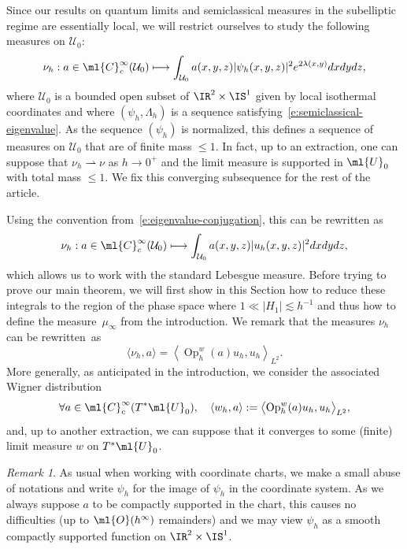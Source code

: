 \documentclass[10pt]{amsart}
\newcommand\mto{\mathchoice{\longmapsto}{\mapsto}{\mapsto}{\mapsto}}
\theoremstyle{plain}
\theoremstyle{definition}
\theoremstyle{remark}
\newtheorem{rema}[theo]{Remark}
\newcommand{\Op}{\operatorname{Op}}
\begin{document}
Since our results on quantum limits and semiclassical measures in the subelliptic regime are essentially local, we will restrict ourselves to study the following measures on $\mathcal{U}_0$:
\[
\nu_h:a\in\ml{C}^\infty_c(\mathcal{U}_0)\mto \int_{\mathcal{U}_0} a(x,y,z)|\psi_h(x,y,z)|^2e^{2\lambda(x,y)}dxdydz,
\]
where $\mathcal{U}_0$ is a bounded open subset of $\IR^2\times\IS^1$ given by local isothermal coordinates and where $(\psi_h,\Lambda_h)$ is a sequence satisfying~\eqref{e:semiclassical-eigenvalue}. As the sequence $(\psi_h)$ is normalized, this defines a sequence of measures on $\mathcal{U}_0$ that are of finite mass $\leq 1$. In fact, up to an extraction, one can suppose that $\nu_h\rightharpoonup\nu$ as $h\to 0^+$ and the limit measure is supported in $\ml{U}_0$ with total mass $\leq 1$. We fix this converging subsequence for the rest of the article.

Using the convention from~\eqref{e:eigenvalue-conjugation}, this can be rewritten as
\[
\nu_h:a\in\ml{C}^\infty_c(\mathcal{U}_0)\mto \int_{\mathcal{U}_0} a(x,y,z)|u_h(x,y,z)|^2dxdydz,
\]
which allows us to work with the standard Lebesgue measure. Before trying to prove our main theorem, we will first show in this Section how to reduce these integrals to the region of the phase space where $1\ll |H_1|\lesssim h^{-1}$ and thus how to define the measure~$\mu_\infty$ from the introduction. We remark that the measures $\nu_h$ can be rewritten~as
\begin{equation}\label{e:measure-pseudo}
\langle\nu_h,a\rangle=\left\langle \Op_h^w(a)u_h,u_h\right\rangle_{L^2}.
\end{equation}
More generally, as anticipated in the introduction, we consider the associated Wigner distribution
\begin{equation}%
\forall a\in\ml{C}^{\infty}_c(T^*\ml{U}_0),\quad\langle w_h,a\rangle: =\bigl\langle \Op_h^w(a)u_h,u_h\bigr\rangle_{L^2},
\end{equation}
and, up to another extraction, we can suppose that it converges to some (finite) limit measure $w$ on $T^*\ml{U}_0$.

\begin{rema} As usual when working with coordinate charts, we make a small abuse of notations and write $\psi_h$ for the image of $\psi_h$ in the coordinate system. As we always suppose $a$ to be compactly supported in the chart, this causes no difficulties (up to $\ml{O}(h^\infty)$ remainders) and we may view $\psi_h$ as a smooth compactly supported function on $\IR^2\times\IS^1$.
\end{rema}
\end{document}
